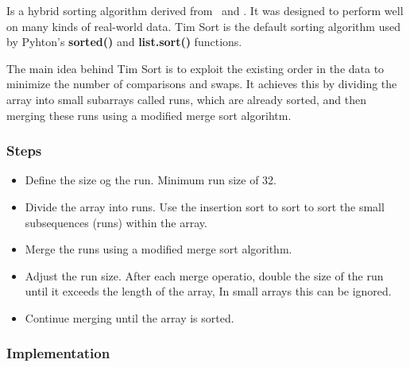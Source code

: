 Is a hybrid sorting algorithm derived from \mergesrt\ and \insertionsrt. It was designed to perform well on many kinds of real-world data. Tim Sort is the default sorting algorithm used by Pyhton's \textbf{sorted()} and \textbf{list.sort()} functions.

The main idea behind Tim Sort is to exploit the existing order in the data to minimize the number of comparisons and swaps. It achieves this by dividing the array into small subarrays called runs, which are already sorted, and then merging these runs using a modified merge sort algorihtm.

\subsubsection*{Steps}

\begin{itemize}
  \item Define the size og the run. Minimum run size of 32.
  \item Divide the array into runs. Use the insertion sort to sort to sort the small subsequences (runs) within the array.
  \item Merge the runs using a modified merge sort algorithm.
  \item Adjust the run size. After each merge operatio, double the size of the run until it exceeds the length of the array, In small arrays this can be ignored.
  \item Continue merging until the array is sorted.
\end{itemize}

\subsubsection*{Implementation}

